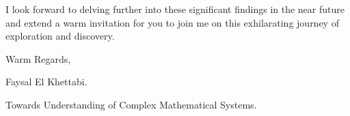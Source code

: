 \documentclass{article}
\begin{document}
I look forward to delving further into these significant findings in the near future and extend a warm invitation for you to join me on this exhilarating journey of exploration and discovery.

Warm Regards,

Faysal El Khettabi.

Towards Understanding of Complex Mathematical Systems.
%
%
%
%
%
%
%
\end{document}

